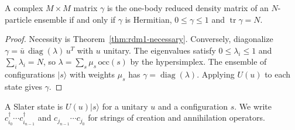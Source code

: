 \begin{theorem}[Coleman]\label{thm:coleman}
  \leanok
  A complex $M\times M$ matrix $\gamma$ is the one-body reduced density matrix of an $N$-particle ensemble if and only if
  $\gamma$ is Hermitian, $0\le\gamma\le1$ and $\operatorname{tr}\gamma=N$.
\end{theorem}
\begin{proof}\leanok
  Necessity is Theorem~\ref{thm:rdm1-necessary}. Conversely, diagonalize $\gamma=\bar u\,\operatorname{diag}(\lambda)\,u^{T}$
  with $u$ unitary. The eigenvalues satisfy $0\le\lambda_i\le1$ and $\sum_i\lambda_i=N$, so
  $\lambda=\sum_s\mu_s\,\mathrm{occ}(s)$ by the hypersimplex. The ensemble of configurations $|s\rangle$ with weights $\mu_s$ has
  $\gamma=\operatorname{diag}(\lambda)$. Applying $U(u)$ to each state gives $\gamma$.
\end{proof}

\begin{definition}\label{def:slater-state}
  \leanok
  A Slater state is $U(u)|s\rangle$ for a unitary $u$ and a configuration $s$. We write
  $c^\dagger_{i_0}\cdots c^\dagger_{i_{n-1}}$ and $c_{j_{n-1}}\cdots c_{j_0}$ for strings of creation and annihilation operators.
\end{definition}

